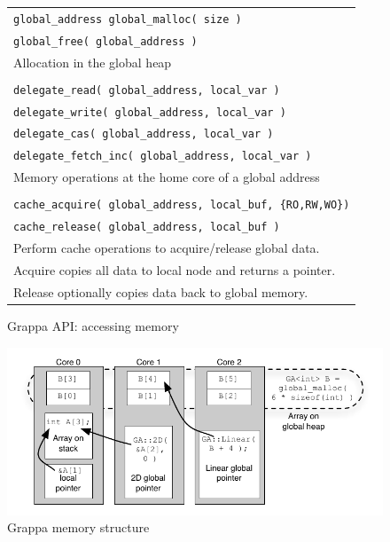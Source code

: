 \begin{figure}[htbp]
  \begin{center}
    \begin{minipage}{\columnwidth}
	\small
	\begin{tabular}{l}
      	\texttt{\scriptsize global\_address global\_malloc( size )} \\
      	\texttt{\scriptsize global\_free( global\_address )} \\ \hline 
      	Allocation in the global heap \\ \\
      	\texttt{\scriptsize delegate\_read( global\_address, local\_var )}  \\
      	\texttt{\scriptsize delegate\_write( global\_address, local\_var )} \\
      	\texttt{\scriptsize delegate\_cas( global\_address, local\_var )} \\
      	\texttt{\scriptsize delegate\_fetch\_inc( global\_address, local\_var )} \\ \hline
      	Memory operations at the home core of a global address \\ \\
      	\texttt{\scriptsize cache\_acquire( global\_address, local\_buf, \{RO,RW,WO\})} \\
      	\texttt{\scriptsize cache\_release( global\_address, local\_buf )} \\ \hline
		Perform cache operations to acquire/release global data.  \\
		Acquire copies all data to local node and returns a pointer. \\ 	
		Release optionally copies data back to global memory. \\
	\end{tabular}
      \caption{\label{fig:accessing-memory} Grappa API: accessing memory}     \end{minipage}
  \end{center}
\end{figure}

\begin{figure}[t]
\begin{center}
  \includegraphics[width=0.95\columnwidth]{figs/memory-structure}
\begin{minipage}{0.95\columnwidth}
  \caption{\label{fig:memory-structure} Grappa memory structure}
\end{minipage}
\vspace{-3ex}
\end{center}
\end{figure}

